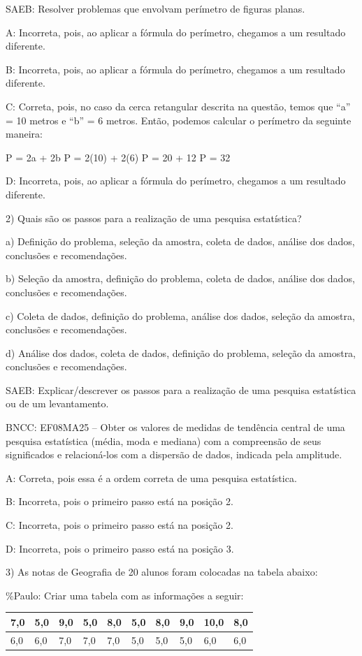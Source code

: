 SAEB: Resolver problemas que envolvam perímetro de figuras planas.

A: Incorreta, pois, ao aplicar a fórmula do perímetro, chegamos a um
resultado diferente.

B: Incorreta, pois, ao aplicar a fórmula do perímetro, chegamos a um
resultado diferente.

C: Correta, pois, no caso da cerca retangular descrita na questão, temos
que ``a'' = 10 metros e ``b'' = 6 metros. Então, podemos calcular o
perímetro da seguinte maneira:

P = 2a + 2b P = 2(10) + 2(6) P = 20 + 12 P = 32

D: Incorreta, pois, ao aplicar a fórmula do perímetro, chegamos a um
resultado diferente.

2) Quais são os passos para a realização de uma pesquisa estatística?

a) Definição do problema, seleção da amostra, coleta de dados, análise
dos dados, conclusões e recomendações.

b) Seleção da amostra, definição do problema, coleta de dados, análise
dos dados, conclusões e recomendações.

c) Coleta de dados, definição do problema, análise dos dados, seleção da
amostra, conclusões e recomendações.

d) Análise dos dados, coleta de dados, definição do problema, seleção da
amostra, conclusões e recomendações.

SAEB: Explicar/descrever os passos para a realização de uma pesquisa
estatística ou de um levantamento.

BNCC: EF08MA25 -- Obter os valores de medidas de tendência central de
uma pesquisa estatística (média, moda e mediana) com a compreensão de
seus significados e relacioná-los com a dispersão de dados, indicada
pela amplitude.

A: Correta, pois essa é a ordem correta de uma pesquisa estatística.

B: Incorreta, pois o primeiro passo está na posição 2.

C: Incorreta, pois o primeiro passo está na posição 2.

D: Incorreta, pois o primeiro passo está na posição 3.

3) As notas de Geografia de 20 alunos foram colocadas na tabela abaixo:

\%Paulo: Criar uma tabela com as informações a seguir:

\begin{longtable}[]{@{}llllllllll@{}}
\toprule
7,0 & 5,0 & 9,0 & 5,0 & 8,0 & 5,0 & 8,0 & 9,0 & 10,0 &
8,0\tabularnewline
\midrule
\endhead
6,0 & 6,0 & 7,0 & 7,0 & 7,0 & 5,0 & 5,0 & 5,0 & 6,0 & 6,0\tabularnewline
\bottomrule
\end{longtable}

